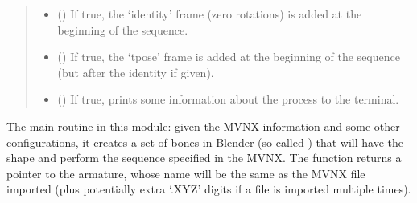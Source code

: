 \documentclass[letterpaper,10pt,english,openany,oneside]{sphinxmanual}
\begin{document}
\begin{fulllineitems}
\begin{quote}
\begin{description}
\begin{itemize}
\item {} 
 () \textendash{} If true, the ‘identity’ frame (zero
rotations) is added at the beginning of the sequence.

\item {} 
 () \textendash{} If true, the ‘tpose’ frame is added at the
beginning of the sequence (but after the identity if given).

\item {} 
 () \textendash{} If true, prints some information about the process
to the terminal.

\end{itemize}

\end{description}\end{quote}

The main routine in this module: given the MVNX information and some other
configurations, it creates a set of bones in Blender (so-called )
that will have the shape and perform the sequence specified in the MVNX.
The function returns a pointer to the armature, whose name will be the same
as the MVNX file imported (plus potentially extra ‘.XYZ’ digits if a file
is imported multiple times).

\end{fulllineitems}

\end{document}
